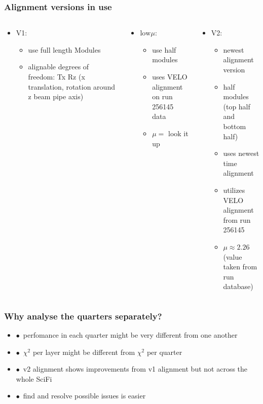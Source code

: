 \documentclass[aspectratio=1610, 12pt]{beamer}
\begin{document}
\begin{frame}\frametitle{Alignment versions in use}
  \begin{columns}
    \begin{column}[c]{0.33\textwidth}
      \begin{itemize}
        \item V1:
        \begin{itemize}
          \item use full length Modules
          \item alignable degrees of freedom: Tx Rz (x translation, rotation around z \to beam pipe axis)
        \end{itemize}
      \end{itemize}
    \end{column}
    \begin{column}[c]{0.33\textwidth}
      \begin{itemize}
        \item $\text{low} \mu$:
        \begin{itemize}
          \item use half modules
          \item uses VELO alignment on run 256145 data
          \item $\mu =$ look it up
        \end{itemize}
      \end{itemize}
    \end{column}
    \begin{column}[c]{0.33\textwidth}
      \begin{itemize}
        \item V2:
        \begin{itemize}
          \item newest alignment version
          \item half modules (top half and bottom half)
          \item uses newest time alignment
          \item utilizes VELO alignment from run 256145
          \item $\mu \approx 2.26$ (value taken from run database)
        \end{itemize}
      \end{itemize}
    \end{column}
  \end{columns}
\end{frame}

\begin{frame}\frametitle{Why analyse the quarters separately?}
  \begin{itemize}
    \item $\bullet$\, perfomance in each quarter might be very different from one another
    \item $\bullet$\, \to $\chi^2$ per layer might be different from $\chi^2$ per quarter
    \item $\bullet$\, v2 alignment shows improvements from v1 alignment but not across the whole SciFi
    \item $\bullet$\, find and resolve possible issues is easier
  \end{itemize}
\end{frame}
\end{document}
